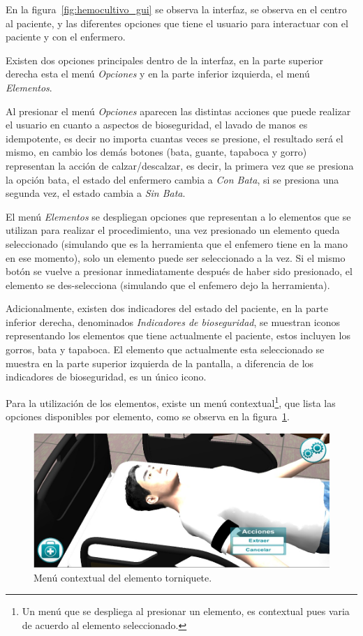 En la figura~\ref{fig:hemocultivo_gui} se observa la interfaz, se observa en el
centro al paciente, y las diferentes opciones que tiene el usuario para
interactuar con el paciente y con el enfermero.

Existen dos opciones principales dentro de la interfaz, en la parte superior
derecha esta el menú \emph{Opciones} y en la parte inferior izquierda, el menú
\emph{Elementos}.

Al presionar el menú \emph{Opciones} aparecen las distintas
acciones que puede realizar el usuario en cuanto a aspectos de bioseguridad, el 
lavado de manos es idempotente, es decir no importa cuantas veces se presione, el 
resultado será el mismo, en cambio los demás botones (bata, guante, tapaboca y gorro)
representan la acción de calzar/descalzar, es decir, la primera vez que se presiona
la opción bata, el estado del enfermero cambia a \emph{Con Bata}, si se presiona una
segunda vez, el estado cambia a \emph{Sin Bata}.

El menú \emph{Elementos} se despliegan opciones que representan a lo elementos que se
utilizan para realizar el procedimiento, una vez presionado un elemento queda
seleccionado (simulando que es la herramienta que el enfemero tiene en la mano
en ese momento), solo un elemento puede ser seleccionado a la vez. Si el mismo
botón se vuelve a presionar inmediatamente después de haber sido presionado, el
elemento se des-selecciona (simulando que el enfemero dejo la herramienta).

Adicionalmente, existen dos indicadores del estado del paciente, en la parte
inferior derecha, denominados \emph{Indicadores de bioseguridad}, se muestran
iconos representando los elementos que tiene actualmente el paciente, estos
incluyen los gorros, bata y tapaboca. El elemento que actualmente esta
seleccionado se muestra en la parte superior izquierda de la pantalla, a
diferencia de los indicadores de bioseguridad, es un único icono.

Para la utilización de los elementos, existe un menú contextual\footnote{Un menú
    que se despliega al presionar un elemento, es contextual pues varia de
    acuerdo al elemento seleccionado.}, que lista las opciones disponibles por
elemento, como se observa en la figura~\ref{fig:hemocultivo_torniquete_cm}.

\begin{figure}
\centering
\includegraphics[scale=0.5]{propuesta/hemocultivo_contextual.jpg}
\caption{Menú contextual del elemento torniquete.}
\label{fig:hemocultivo_torniquete_cm}
\end{figure}

